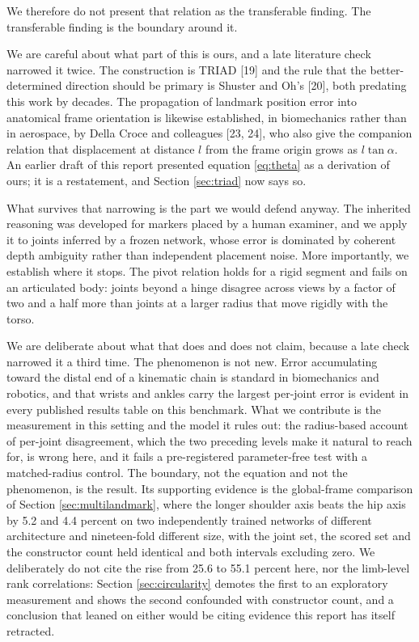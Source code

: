 \documentclass[12pt,a4paper]{report}
\begin{document}
We therefore do not present that relation as the transferable finding. The transferable finding is the boundary around it.

We are careful about what part of this is ours, and a late literature check narrowed it twice. The construction is TRIAD [19] and the rule that the better-determined direction should be primary is Shuster and Oh's [20], both predating this work by decades. The propagation of landmark position error into anatomical frame orientation is likewise established, in biomechanics rather than in aerospace, by Della Croce and colleagues [23, 24], who also give the companion relation that displacement at distance $l$ from the frame origin grows as $l \tan\alpha$. An earlier draft of this report presented equation \eqref{eq:theta} as a derivation of ours; it is a restatement, and Section \ref{sec:triad} now says so.

What survives that narrowing is the part we would defend anyway. The inherited reasoning was developed for markers placed by a human examiner, and we apply it to joints inferred by a frozen network, whose error is dominated by coherent depth ambiguity rather than independent placement noise. More importantly, we establish where it stops. The pivot relation holds for a rigid segment and fails on an articulated body: joints beyond a hinge disagree across views by a factor of two and a half more than joints at a larger radius that move rigidly with the torso.

We are deliberate about what that does and does not claim, because a late check narrowed it a third time. The phenomenon is not new. Error accumulating toward the distal end of a kinematic chain is standard in biomechanics and robotics, and that wrists and ankles carry the largest per-joint error is evident in every published results table on this benchmark. What we contribute is the measurement in this setting and the model it rules out: the radius-based account of per-joint disagreement, which the two preceding levels make it natural to reach for, is wrong here, and it fails a pre-registered parameter-free test with a matched-radius control. The boundary, not the equation and not the phenomenon, is the result. Its supporting evidence is the global-frame comparison of Section \ref{sec:multilandmark}, where the longer shoulder axis beats the hip axis by 5.2 and 4.4 percent on two independently trained networks of different architecture and nineteen-fold different size, with the joint set, the scored set and the constructor count held identical and both intervals excluding zero. We deliberately do not cite the rise from 25.6 to 55.1 percent here, nor the limb-level rank correlations: Section \ref{sec:circularity} demotes the first to an exploratory measurement and shows the second confounded with constructor count, and a conclusion that leaned on either would be citing evidence this report has itself retracted.
\end{document}
